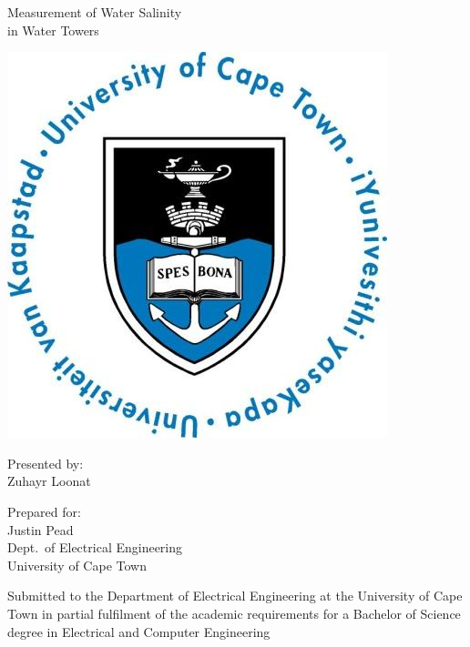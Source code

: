 \documentclass[a4paper,12pt]{report}
\begin{document}
\thispagestyle{empty}
    {\Huge \begin{center}
        Measurement of Water Salinity \\in Water Towers
    \end{center}}

    \vskip 5mm
    \begin{center}
        \includegraphics[scale = 0.35]{Figures/uctLogo.png}
    \end{center}

    \vskip 5mm
    \begin{center}
        Presented by:\\
        Zuhayr Loonat		%
    \end{center}

    \vskip 10mm
    \begin{center}
        Prepared for:\\
        Justin Pead\\ 		%
        Dept.~of Electrical Engineering\\University of Cape Town
    \end{center}


    \vskip 10mm
    \begin{center}
        Submitted to the Department of Electrical Engineering at the University of Cape Town in partial
        fulfilment of the academic requirements for a Bachelor of Science degree in Electrical and Computer Engineering
    \end{center}
\end{document}
